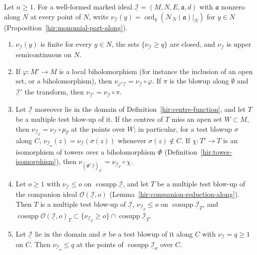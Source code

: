 \begin{lemma}
\mixedleanok
Let \(n\ge1\). For a well-formed marked ideal \(\underline{\mathcal I}=(M,N,E,\mathfrak a,d)\) with \(\mathfrak a\) nonzero along \(N\) at every point of \(N\), write
\(\nu_{\underline{\mathcal I}}(y)=\operatorname{ord}_y(\mathcal N_N(\mathfrak a)|_N)\) for \(y\in N\) (Proposition~\ref{hir:monomial-part-along}).
\begin{enumerate}
\item \(\nu_{\underline{\mathcal I}}(y)\) is finite for every \(y\in N\), the sets \(\{\nu_{\underline{\mathcal I}}\ge q\}\) are closed, and \(\nu_{\underline{\mathcal I}}\) is upper
semicontinuous on \(N\).
\item If \(\varphi\colon M'\to M\) is a local biholomorphism (for instance the inclusion of an open set, or a biholomorphism), then
\(\nu_{\varphi^*\underline{\mathcal I}}=\nu_{\underline{\mathcal I}}\circ\varphi\). If \(\pi\) is the blowup along \(\emptyset\) and \(\underline{\mathcal I}'\) the transform, then
\(\nu_{\underline{\mathcal I}'}=\nu_{\underline{\mathcal I}}\circ\pi\).
\item Let \(\underline{\mathcal I}\) moreover lie in the domain of Definition~\ref{hir:centre-function}, and let \(T\) be a multiple test blow-up of it. If the centres of
\(T\) miss an open set \(W\subset M\), then \(\nu_{\underline{\mathcal I}_T}=\nu_{\underline{\mathcal I}}\circ p_T\) at the points over \(W\); in particular, for a test blowup
\(\sigma\) along \(C\), \(\nu_{\underline{\mathcal I}_\sigma}(z)=\nu_{\underline{\mathcal I}}(\sigma(z))\) whenever \(\sigma(z)\notin C\). If \(\chi\colon T'\to T\) is an
isomorphism of towers over a biholomorphism \(\Phi\) (Definition~\ref{hir:tower-isomorphism}), then
\(\nu_{(\Phi^*\underline{\mathcal I})_{T'}}=\nu_{\underline{\mathcal I}_T}\circ\chi\).
\item Let \(o\ge1\) with \(\nu_{\underline{\mathcal I}}\le o\) on \(\operatorname{cosupp}\underline{\mathcal I}\), and let \(T\) be a multiple test blow-up of the companion ideal
\(\mathcal O(\underline{\mathcal I},o)\) (Lemma~\ref{hir:companion-reduction-along}). Then \(T\) is a multiple test blow-up of \(\underline{\mathcal I}\),
\(\nu_{\underline{\mathcal I}_T}\le o\) on \(\operatorname{cosupp}\underline{\mathcal I}_T\), and
\(\operatorname{cosupp}\mathcal O(\underline{\mathcal I},o)_T\subset\{\nu_{\underline{\mathcal I}_T}\ge o\}\cap\operatorname{cosupp}\underline{\mathcal I}_T\).
\item Let \(\underline{\mathcal I}\) lie in the domain and \(\sigma\) be a test blowup of it along \(C\) with \(\nu_{\underline{\mathcal I}}=q\ge1\) on \(C\). Then
\(\nu_{\underline{\mathcal I}_\sigma}\le q\) at the points of \(\operatorname{cosupp}\underline{\mathcal I}_\sigma\) over \(C\).
\end{enumerate}
\end{lemma}
